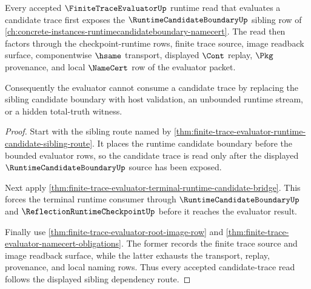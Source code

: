 \begin{theorem}
\label{thm:finite-trace-evaluator-runtime-candidate-dependency-route}
Every accepted $\FiniteTraceEvaluatorUp$ runtime read that evaluates a candidate trace first exposes the $\RuntimeCandidateBoundaryUp$ sibling row of \autoref{ch:concrete-instances-runtimecandidateboundary-namecert}. The read then factors through the checkpoint-runtime rows, finite trace source, image readback surface, componentwise $\hsame$ transport, displayed $\Cont$ replay, $\Pkg$ provenance, and local $\NameCert$ row of the evaluator packet.

Consequently the evaluator cannot consume a candidate trace by replacing the sibling candidate boundary with host validation, an unbounded runtime stream, or a hidden total-truth witness.
\end{theorem}
\begin{proof}
Start with the sibling route named by \autoref{thm:finite-trace-evaluator-runtime-candidate-sibling-route}. It places the runtime candidate boundary before the bounded evaluator rows, so the candidate trace is read only after the displayed $\RuntimeCandidateBoundaryUp$ source has been exposed.

Next apply \autoref{thm:finite-trace-evaluator-terminal-runtime-candidate-bridge}. This forces the terminal runtime consumer through $\RuntimeCandidateBoundaryUp$ and $\ReflectionRuntimeCheckpointUp$ before it reaches the evaluator result.

Finally use \autoref{thm:finite-trace-evaluator-root-image-row} and \autoref{thm:finite-trace-evaluator-namecert-obligations}. The former records the finite trace source and image readback surface, while the latter exhausts the transport, replay, provenance, and local naming rows. Thus every accepted candidate-trace read follows the displayed sibling dependency route.
\end{proof}
